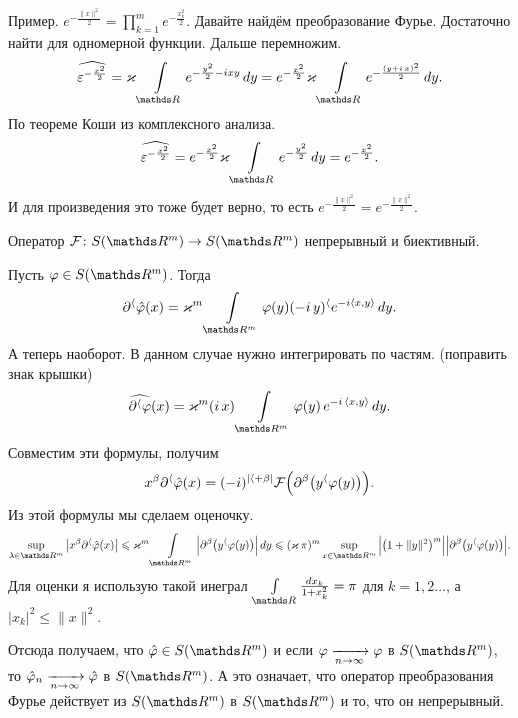 Пример. $e^{-\frac{\|x\|^2}2} = \prod\limits_{k=1}^me^{-\frac{x_k^2}2}$. Давайте найдём преобразование Фурье. Достаточно найти для одномерной функции. Дальше перемножим.
\begin{equation}\label{Ermit1}
  \widehat{\e^{-\frac{x^2}2}} = \varkappa\Gint\R e^{-\frac{y^2}2-ixy}\,dy = 
  e^{-\frac {x^2}2}\varkappa\Gint\R e^{-\frac{(y+i\,x)^2}2}\,dy.
\end{equation}
По теореме Коши из комплексного анализа.
\[\widehat{\e^{-\frac{x^2}2}} = 
  e^{-\frac{x^2}2}\varkappa\Gint\R e^{-\frac{y^2}2}\,dy = e^{-\frac{x^2}2}.
\]
И для произведения это тоже будет верно, то есть 
$e^{-\frac{\|x\|^2}2}=e^{-\frac{\|x\|^2}2}$.
\begin{Lem}
  Оператор $\mathcal F\colon S(\R^m)\to S(\R^m)$ непрерывный и биективный.
\end{Lem}
\begin{Proof}
  Пусть $\phi\in S(\R^m)$. Тогда 
\[
\dl^\a\hat\phi(x) = \varkappa^m\Gint{\R^m}\phi(y)(-i\,y)^\a e^{-i\la x,y\ra}\,dy.
\]
А теперь наоборот. В данном случае нужно интегрировать по частям. (поправить знак крышки)
\[
  \widehat{\dl^\a\phi}(x) = \varkappa^m(i\,x)\Gint{\R^m}\phi(y)\,e^{-i\,\la x,y\ra}\,dy.
\]
Совместим эти формулы, получим
\[
  x^\beta\partial^\langle\hat{\varphi}(x) = (-i)^{|\langle+\beta|}\mathcal F\Big(\partial^\beta\big(y^\langle\varphi(y)\big)\Big).
\]
Из этой формулы мы сделаем оценочку.
\[
  \sup\limits_{\l\in\R^m}\big|x^\b\dl^\a\hat\phi(x)\big|\le\varkappa^m\Gint{\R^m}\Big|\dl^\b\big(y^\a\phi(y)\big)\Big|\,dy\le
  (\varkappa\,\pi)^m\sup\limits_{x\in\R^m} \Big|\big(1+\|y\|^2\big)^m\Big|\Big|\dl^\b\big(y^\a\phi(y)\big)\Big|.
\]
Для оценки я использую такой инеграл $\Gint\R\frac{dx_k}{1+x_k^2} = \pi$ для $k=1,2\dots$, а $|x_k|^2\le \|x\|^2$.

Отсюда получаем, что $\hat\phi\in S(\R^m)$ и если $\varphi\xrightarrow[n\rightarrow\infty]{}\varphi$ в $S(\R^m)$, то $\hat{\varphi}_n\xrightarrow[n\rightarrow\infty]{} \hat{\varphi}$ в $S(\R^m)$. А это означает, что оператор преобразования Фурье действует из $S(\R^m)$ в $S(\R^m)$ и то, что он непрерывный.


\end{Proof}
